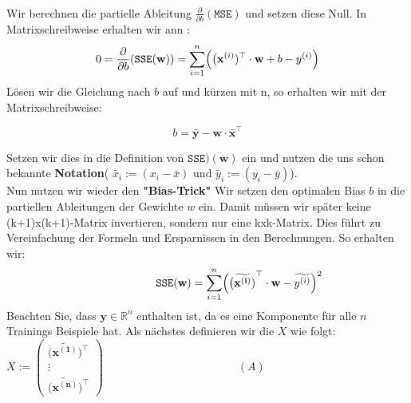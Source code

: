 \documentclass[12pt]{article}
\begin{document}
\\[0.2cm]
Wir berechnen die partielle Ableitung $ \frac{\partial}{\partial b}(\mathtt{MSE})$ und setzen diese Null. In Matrixschreibweise  erhalten wir ann :\\[0.2cm]
\begin{equation}
    0 = \frac{\partial}{\partial b}(\mathtt{SSE}(\mathbf{w})) =  \sum\limits_{i=1}^n \Bigl(\bigl(\mathbf{x}^{(i)})^\top \cdot \mathbf{w} + b - y^{(i)}\Bigr)
\end{equation}
Lösen wir die Gleichung nach $b$ auf und kürzen mit n,  so erhalten wir mit der Matrixschreibweise:
\begin{large}
\begin{equation}
    \label{eq:squared-error-3}
    b = \bar{\mathbf{y}}- \mathbf{w} \cdot \bar{\mathbf{x}}^\top    
\end{equation}
\end{large}
Setzen wir dies in die Definition von $\mathtt{SSE})(\mathbf{w}) $ ein und nutzen die uns schon bekannte \textbf{Notation}( 
 $ \widetilde{x_i} := (x_i - \bar{x}) $ und $ \widetilde{y_i} := (y_i - \bar{y})$). \\
Nun nutzen wir wieder den \textbf{"Bias-Trick"} Wir setzen den optimalen Bias $b$ in die partiellen Ableitungen der Gewichte $w$ ein. Damit müssen wir später keine (k+1)x(k+1)-Matrix invertieren, sondern nur eine kxk-Matrix. Dies führt zu Vereinfachung der Formeln und  Ersparnissen in den Berechnungen. So erhalten wir:
\begin{equation}
  \hspace*{2.0cm}
  \label{eq:squared-error-4}
  \mathtt{SSE}(\mathbf{w}) = \sum\limits_{i=1}^n \Bigl(\bigl(\mathbf{\widetilde{{x}^{(i)}})}^\top \cdot \mathbf{w} - \widetilde{y^{(i)}}\Bigr)^2
\end{equation}
Beachten Sie, dass $\mathbf{y} \in \mathbb{R}^n$ enthalten ist, da es eine Komponente für alle $n$ Trainings Beispiele hat. Als nächstes definieren wir die {\color{blue}{Designmatrix}} $X$ wie folgt:
\\[0.3cm]
\hspace*{5.5cm}
$ X := \left(
  \begin{array}{c}
    \bigl(\mathbf{\widetilde{x^{(1)}}}\bigr)^\top \\
    \vdots \\
    \bigl(\mathbf{\widetilde{x^{(n)}}}\bigr)^\top
  \end{array}
  \right)   \qquad \qquad \qquad \qquad \qquad \qquad (A)
$   
\\[0.2cm]
\end{document}

